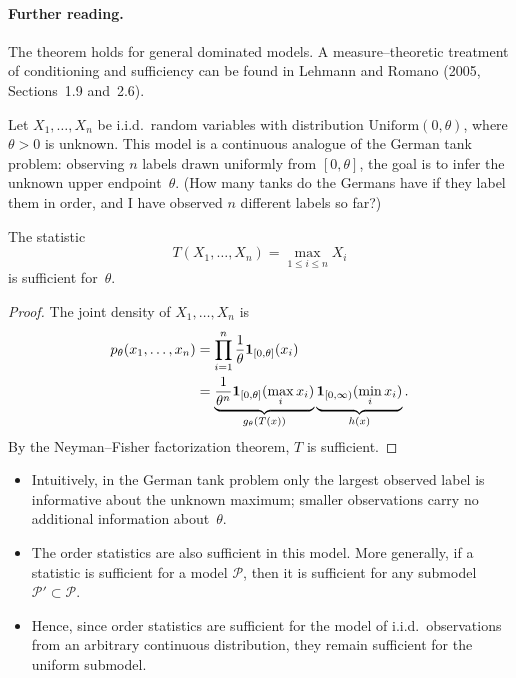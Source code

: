 \paragraph{Further reading.}
The theorem holds for general dominated models.
A measure--theoretic treatment of conditioning and sufficiency can be found in
Lehmann and Romano (2005, Sections~1.9 and~2.6).

\begin{ex}
    \label{ex:ch3_um}
Let \(X_1,\dots,X_n\) be i.i.d.\ random variables with distribution \(\mathrm{Uniform}(0,\theta)\), where \(\theta>0\) is unknown.  
This model is a continuous analogue of the German tank problem: observing \(n\) labels drawn uniformly from \([0,\theta]\), the goal is to infer the unknown upper endpoint~\(\theta\).
(How many tanks do the Germans have if they label them in order, and I have observed \(n\) different labels so far?)
\end{ex}

\begin{claim}
The statistic
\[
T(X_1,\dots,X_n)=\max_{1\le i\le n} X_i
\]
is sufficient for~\(\theta\).
\end{claim}

\begin{proof}
The joint density of \(X_1,\dots,X_n\) is
\begin{align*}
        p_{\theta}(x_1,\dots ,x_{n}) 
        &= \prod\limits_{i=1}^{n} \frac{1}{\theta}\boldsymbol{1}_{[0,\theta]}(x_{i})
      \\&
      =\underbrace{\frac{1}{\theta^{n}}\boldsymbol{1}_{[0,\theta]}(\max\limits_{i} x_{i})}_{g_{\theta}(T(x))}\underbrace{\boldsymbol{1}_{[0,\infty)}(\min\limits_{i} x_{i})}_{h(x)}.
\end{align*}
By the Neyman--Fisher factorization theorem, \(T\) is sufficient.
\end{proof}

\begin{remark}
\leavevmode
\begin{itemize}
\item Intuitively, in the German tank problem only the largest observed label is informative about the unknown maximum; smaller observations carry no additional information about~\(\theta\).
\item The order statistics are also sufficient in this model. More generally, if a statistic is sufficient for a model \(\mathcal P\), then it is sufficient for any submodel \(\mathcal P'\subset\mathcal P\).
\item Hence, since order statistics are sufficient for the model of i.i.d.\ observations from an arbitrary continuous distribution, they remain sufficient for the uniform submodel.
\end{itemize}
\end{remark}

